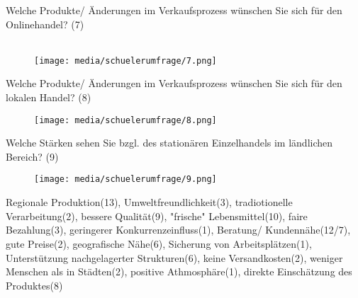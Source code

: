 \newpage\noindent Welche Produkte/ Änderungen im Verkaufsprozess wünschen Sie sich für den Onlinehandel? (7)\\\\

\begin{figure}[H]
    \begin{center}
        \texttt{[image: media/schuelerumfrage/7.png]} 
    \end{center}
\end{figure}
\iffalse
mehr Zahlungswege(9)(Paysafe-Card(3), Paypal(6), Kauf auf Rechnung(3)), mehr Sicherheit(6), besserer Versand(11), transparente Lieferungsverfolgung(8), mehr Produktinformationen(7), einheitliche Größen(1), bessere Rückgaben(10), Nachhaltigkeit(3), bessere Produktzustände(5), niedrigere Versandkosten(5), teuereren Rückversand(1), keine(8)\\\\
\fi
\noindent Welche Produkte/ Änderungen im Verkaufsprozess wünschen Sie sich für den lokalen Handel? (8)\\
\begin{figure}[H]
    \begin{center}
        \texttt{[image: media/schuelerumfrage/8.png]}
    \end{center} 
\end{figure}
\iffalse
mehr Auswahl(21), mehr/bessere Beratung(5), mehr kulturelles(1), mehr Bekleidung(7), geringere Preise(8), bessere Online-Einbindung(2), größere Produktmengen(2), kontaktloses Zahlen(5), mehr Jugendorientierung(3), längere Öffnungszeiten(2), bessere Infrastruktur(2), bessere Ladenstruktur(1), nichts(19)\\\\
\fi
\newpage\noindent Welche Stärken sehen Sie bzgl. des stationären Einzelhandels im ländlichen Bereich? (9)\\
\begin{figure}[H]
    \begin{center}
        \texttt{[image: media/schuelerumfrage/9.png]}
    \end{center}
\end{figure}
\iffalse
Regionale Produktion(13), Umweltfreundlichkeit(3), tradiotionelle Verarbeitung(2), bessere Qualität(9), "frische" Lebensmittel(10), faire Bezahlung(3), geringerer Konkurrenzeinfluss(1), Beratung/ Kundennähe(12/7), gute Preise(2), geografische Nähe(6), Sicherung von Arbeitsplätzen(1), Unterstützung nachgelagerter Strukturen(6), keine Versandkosten(2), weniger Menschen als in Städten(2), positive Athmosphäre(1), direkte Einschätzung des Produktes(8)\\

